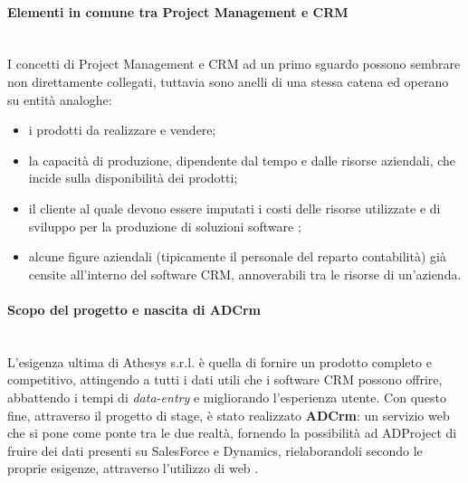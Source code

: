 \documentclass[12pt,a4paper,twoside,openany,english]{book}
\begin{document}
	\paragraph{Elementi in comune tra Project Management e CRM}~\\
		I concetti di Project Management e \gls{CRM} ad un primo sguardo possono sembrare non direttamente collegati, tuttavia sono anelli di una stessa catena ed operano su entità analoghe:
		\begin{itemize}
			\itemsep-0.5em 
			\item i prodotti da realizzare e vendere;
			\item la capacità di produzione, dipendente dal tempo e dalle risorse aziendali, che incide sulla disponibilità dei prodotti;	
			\item il cliente al quale devono essere imputati i costi delle risorse utilizzate e di sviluppo per la produzione di soluzioni software ;
			\item alcune figure aziendali (tipicamente il personale del reparto contabilità) già censite all'interno del software \gls{CRM}, annoverabili tra le risorse di un'azienda.
		\end{itemize}
	\par
	
	\paragraph{Scopo del progetto e nascita di ADCrm}~\\
		L'esigenza ultima di Athesys s.r.l. è quella di fornire un prodotto completo e competitivo, attingendo a tutti i dati utili che i software \gls{CRM} possono offrire, abbattendo i tempi di \textit{data-entry} e migliorando l'esperienza utente. Con questo fine, attraverso il progetto di stage, è stato realizzato \textbf{ADCrm}: un servizio web che si pone come ponte tra le due realtà, fornendo la possibilità ad ADProject di fruire dei dati presenti su SalesForce e Dynamics, rielaborandoli secondo le proprie esigenze, attraverso l'utilizzo di web .
	\par

\tableofcontents
\listoffigures
\listoftables
\mainmatter
\end{document}
